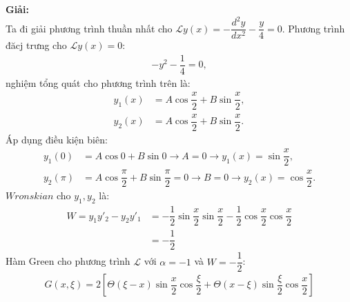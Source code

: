 \documentclass{report}
\newcommand{\f}[2]{\dfrac{#1}{#2}}
\begin{document}
\textbf{Giải:}\\
Ta đi giải phương trình thuần nhất cho $\mathcal{L} y(x) = -\dfrac{d^2 y}{dx^2} - \dfrac{y}{4}  = 0$. Phương trình đăcj trưng cho $\mathcal{L} y(x) = 0:$
\begin{align*}
	-y^2 - \dfrac{1}{4} = 0,
\end{align*}
nghiệm tổng quát cho phương trình trên là:
\begin{align*}
	y_{1}(x) &= A \cos \f{x}{2} + B \sin \f{x}{2},\\
	y_{2}(x) &= A \cos \f{x}{2} + B \sin \f{x}{2}.
\end{align*}
Áp dụng điều kiện biên:
\begin{align*}
	y_{1}(0) &= A \cos 0 + B \sin 0 \rightarrow A = 0 \rightarrow y_{1}(x) = \sin \f{x}{2}, \\
	y_{2}(\pi) &= A \cos \f{\pi}{2} + B \sin \f{\pi}{2} = 0 \rightarrow B = 0 \rightarrow y_2(x) = \cos \f{x}{2}.
\end{align*}
$Wronskian$ cho $y_1,y_2$ là:
\begin{align*}
	W = y_1 y'_2 - y_2 y'_1 
	&= -\f{1}{2} \sin \f{x}{2} \sin \f{x}{2} - \f{1}{2} \cos \f{x}{2} \cos \f{x}{2}\\
	& = -\f{1}{2} 
\end{align*}
Hàm Green cho phương trình $\mathcal{L}$ với $\alpha = - 1$ và $ W = -\f{1}{2}$:
\begin{align*}
	G(x,\xi) = 2 \left[ \Theta(\xi - x) \sin \f{x}{2} \cos \f{\xi}{2} + \Theta(x-\xi) \sin \f{\xi}{2} \cos \f{x}{2} \right]
\end{align*}
\end{document}
